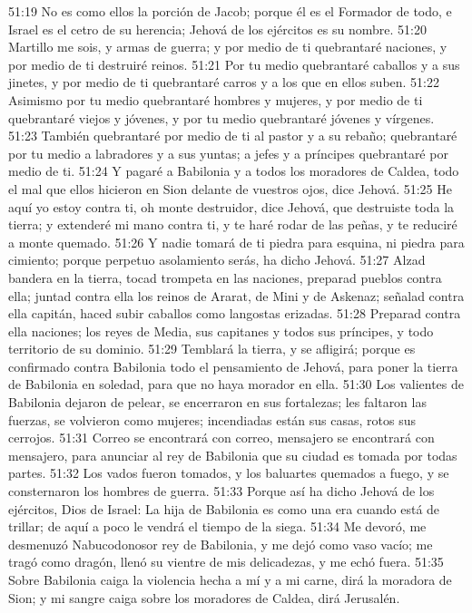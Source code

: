 51:19 No es como ellos la porción de Jacob; porque él es el Formador de todo, e Israel es el cetro de su herencia; Jehová de los ejércitos es su nombre.  
51:20 Martillo me sois, y armas de guerra; y por medio de ti quebrantaré naciones, y por medio de ti destruiré reinos.  
51:21 Por tu medio quebrantaré caballos y a sus jinetes, y por medio de ti quebrantaré carros y a los que en ellos suben.  
51:22 Asimismo por tu medio quebrantaré hombres y mujeres, y por medio de ti quebrantaré viejos y jóvenes, y por tu medio quebrantaré jóvenes y vírgenes.  
51:23 También quebrantaré por medio de ti al pastor y a su rebaño; quebrantaré por tu medio a labradores y a sus yuntas; a jefes y a príncipes quebrantaré por medio de ti.  
51:24 Y pagaré a Babilonia y a todos los moradores de Caldea, todo el mal que ellos hicieron en Sion delante de vuestros ojos, dice Jehová.  
51:25 He aquí yo estoy contra ti, oh monte destruidor, dice Jehová, que destruiste toda la tierra; y extenderé mi mano contra ti, y te haré rodar de las peñas, y te reduciré a monte quemado.  
51:26 Y nadie tomará de ti piedra para esquina, ni piedra para cimiento; porque perpetuo asolamiento serás, ha dicho Jehová.  
51:27 Alzad bandera en la tierra, tocad trompeta en las naciones, preparad pueblos contra ella; juntad contra ella los reinos de Ararat, de Mini y de Askenaz; señalad contra ella capitán, haced subir caballos como langostas erizadas.  
51:28 Preparad contra ella naciones; los reyes de Media, sus capitanes y todos sus príncipes, y todo territorio de su dominio.  
51:29 Temblará la tierra, y se afligirá; porque es confirmado contra Babilonia todo el pensamiento de Jehová, para poner la tierra de Babilonia en soledad, para que no haya morador en ella.  
51:30 Los valientes de Babilonia dejaron de pelear, se encerraron en sus fortalezas; les faltaron las fuerzas, se volvieron como mujeres; incendiadas están sus casas, rotos sus cerrojos.  
51:31 Correo se encontrará con correo, mensajero se encontrará con mensajero, para anunciar al rey de Babilonia que su ciudad es tomada por todas partes.  
51:32 Los vados fueron tomados, y los baluartes quemados a fuego, y se consternaron los hombres de guerra.  
51:33 Porque así ha dicho Jehová de los ejércitos, Dios de Israel: La hija de Babilonia es como una era cuando está de trillar; de aquí a poco le vendrá el tiempo de la siega.  
51:34 Me devoró, me desmenuzó Nabucodonosor rey de Babilonia, y me dejó como vaso vacío; me tragó como dragón, llenó su vientre de mis delicadezas, y me echó fuera.  
51:35 Sobre Babilonia caiga la violencia hecha a mí y a mi carne, dirá la moradora de Sion; y mi sangre caiga sobre los moradores de Caldea, dirá Jerusalén.  
